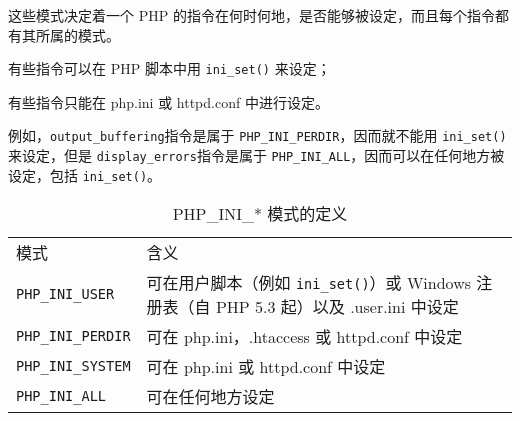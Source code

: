 这些模式决定着一个 PHP 的指令在何时何地，是否能够被设定，而且每个指令都有其所属的模式。

\begin{compactitem}
\item 有些指令可以在 PHP 脚本中用 \texttt{ini\_set()} 来设定；
\item 有些指令只能在 php.ini 或 httpd.conf 中进行设定。
\end{compactitem}

例如，\texttt{output\_buffering}指令是属于 \texttt{PHP\_INI\_PERDIR}，因而就不能用 \texttt{ini\_set()}来设定，但是 \texttt{display\_errors}指令是属于 \texttt{PHP\_INI\_ALL}，因而可以在任何地方被设定，包括 \texttt{ini\_set()}。



\begin{table}[htbp]
\centering
\caption{PHP\_INI\_* 模式的定义}
\label{php_ini_*}
\begin{tabular}{m{80pt}m{280pt}}
\hline
模式							&含义\\
\texttt{PHP\_INI\_USER}	 &可在用户脚本（例如 \texttt{ini\_set()}）或 Windows 注册表（自 PHP 5.3 起）以及 .user.ini 中设定\\
\texttt{PHP\_INI\_PERDIR}	&可在 php.ini，.htaccess 或 httpd.conf 中设定\\
\texttt{PHP\_INI\_SYSTEM}	&可在 php.ini 或 httpd.conf 中设定\\
\texttt{PHP\_INI\_ALL}		&可在任何地方设定\\
\end{tabular}
\end{table}


